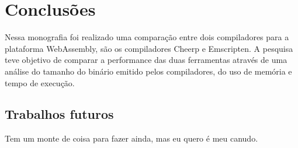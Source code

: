 \chapter{Conclusões}\label{conclusoes}

Nessa monografia foi realizado uma comparação entre dois compiladores para a plataforma WebAssembly, são os compiladores Cheerp e Emscripten. A pesquisa teve objetivo de comparar a performance das duas ferramentas através de uma análise do tamanho do binário emitido pelos compiladores, do uso de memória e tempo de execução.


\section{Trabalhos futuros}

Tem um monte de coisa para fazer ainda, mas eu quero é meu canudo.
